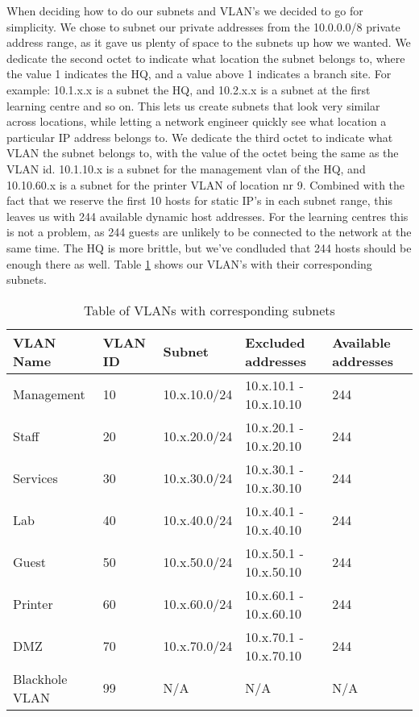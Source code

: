 When deciding how to do our subnets and VLAN's we decided to go for simplicity. We chose to subnet our private addresses from the 10.0.0.0/8 private address range, as it gave us plenty of space to the subnets up how we wanted. We dedicate the second octet to indicate what location the subnet belongs to, where the value 1 indicates the HQ, and a value above 1 indicates a branch site. For example: 10.1.x.x is a subnet the HQ, and 10.2.x.x is a subnet at the first learning centre and so on. This lets us create subnets that look very similar across locations, while letting a network engineer quickly see what location a particular IP address belongs to. We dedicate the third octet to indicate what VLAN the subnet belongs to, with the value of the octet being the same as the VLAN id. 10.1.10.x is a subnet for the management vlan of the HQ, and 10.10.60.x is a subnet for the printer VLAN of location nr 9. Combined with the fact that we reserve the first 10 hosts for static IP's in each subnet range, this leaves us with 244 available dynamic host addresses. For the learning centres this is not a problem, as 244 guests are unlikely to be connected to the network at the same time. The HQ is more brittle, but we've condluded that 244 hosts should be enough there as well. Table \ref{vlansubnettable} shows our VLAN's with their corresponding subnets.

\begin{table}[H]
\caption{Table of VLANs with corresponding subnets}
\label{vlansubnettable}
\begin{tabular}{|l|l|l|l|l|}
\hline
\textbf{VLAN Name} & \textbf{VLAN ID} & \textbf{Subnet} & \textbf{Excluded addresses} & \textbf{Available addresses} \\ \hline

Management     & 10      & 10.x.10.0/24 & 10.x.10.1 - 10.x.10.10 & 244 \\ \hline
Staff          & 20      & 10.x.20.0/24 & 10.x.20.1 - 10.x.20.10 & 244 \\ \hline
Services       & 30      & 10.x.30.0/24 & 10.x.30.1 - 10.x.30.10 & 244 \\ \hline
Lab            & 40      & 10.x.40.0/24 & 10.x.40.1 - 10.x.40.10 & 244 \\ \hline
Guest          & 50      & 10.x.50.0/24 & 10.x.50.1 - 10.x.50.10 & 244 \\ \hline
Printer        & 60      & 10.x.60.0/24 & 10.x.60.1 - 10.x.60.10 & 244 \\ \hline
DMZ            & 70      & 10.x.70.0/24 & 10.x.70.1 - 10.x.70.10 & 244 \\ \hline
Blackhole VLAN & 99      & N/A          & N/A                    & N/A \\ \hline
\end{tabular}
\end{table}


